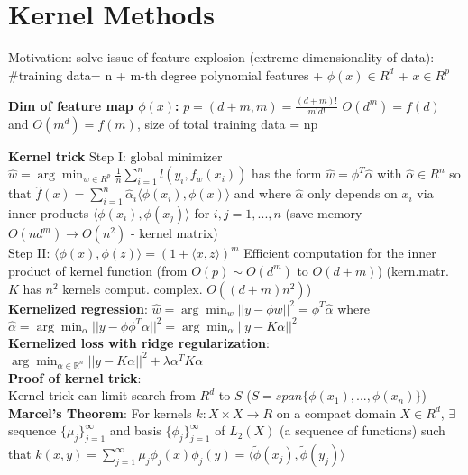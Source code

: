 
\section{Kernel Methods}
Motivation: solve issue of feature explosion (extreme dimensionality of data): \#training data= n + m-th degree polynomial features + $ \phi(x) \in R^d$  + $ x \in R^p$

\textbf{Dim of feature map $\phi(x)$:} $p = (d+m, m) = \frac{(d+m)!}{m!d!}$ $O(d^m) = f(d)$ and $O(m^d) = f(m)$, size of total training data = np

\textbf{Kernel trick}
Step I: global minimizer $\hat{w} = \arg \min_{w \in R^p} \frac{1}{n} \sum^{n}_{i=1}l(y_i, f_w(x_i))$ has the form $\hat{w} = {\phi}^T\hat{\alpha}$ with $\hat{\alpha} \in R^n$ so that $\hat{f}(x) = \sum^{n}_{i=1}\hat{\alpha}_i \langle  \phi(x_i), \phi(x) \rangle$ and where $\hat{\alpha}$ only depends on $x_i$ via inner products $\langle  \phi(x_i) , \phi(x_j) \rangle$ for $i, j = 1, ..., n$ (save memory $O(n{d^m}) \rightarrow O(n^2)$ - kernel matrix)\\
Step II: $\langle \phi(x), \phi(z) \rangle = (1 + \langle x,z \rangle)^m$ Efficient computation for the inner product of kernel function (from $O(p)\sim O(d^m)$ to $O(d+m)$) (kern.matr. $K$ has $n^2$ kernels comput. complex. $O((d+m)n^2)$)\\

\textbf{Kernelized regression}:
$\hat{w} = \arg \min_w ||y-\phi w||^2 = \phi^T \hat{\alpha}$ where $\hat{\alpha} = \arg \min_{\alpha}||y-\phi\phi^T\alpha||^2 = \arg \min_{\alpha} ||y-K\alpha||^2$\\
\textbf{Kernelized loss with ridge regularization}:
$\arg \min_{\alpha \in \mathbb{R}^n} ||y - K\alpha||^2 + \lambda {\alpha^T}K\alpha$\\
\textbf{Proof of kernel trick}:\\
Kernel trick can limit search from $R^d$ to $S$ ($S = span \{\phi(x_1), ..., \phi(x_n)\}$) \\
\textbf{Marcel's Theorem}: For kernels $k:X \times X \rightarrow R$ on a compact domain $X \in R^d$, $\exists$ sequence $\{\mu_j\}^{\infty}_{j=1}$ and basis $\{\phi_j\}^{\infty}_{j=1}$ of $L_2(X)$ (a sequence of functions) such that $k(x, y) = \sum^{\infty}_{j=1}\mu_j \phi_j(x)\phi_j(y) = \langle  \tilde{\phi}(x_j) , \tilde{\phi}(y_j) \rangle$ 

